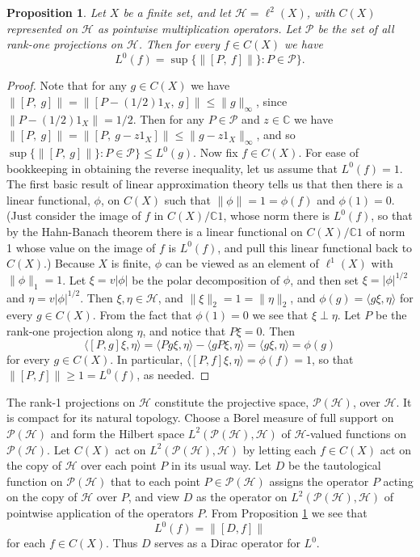 \documentclass{amsart}[14pt]
\newtheorem{proposition}[theorem]{Proposition}
\theoremstyle{definition}
\theoremstyle{remark}
\newcommand{\cH}{{\mathcal H}}
\newcommand{\cP}{{\mathcal P}}
\newcommand{\bC}{{\mathbb C}}
\newcommand{\<}{\langle}
\renewcommand{\>}{\rangle}
\numberwithin{equation}{section}
\begin{document}
{\begin{proposition}
\label{project}
Let $X$ be a finite set, and let $\cH = \ell^2(X)$, with $C(X)$
represented on $\cH$ as pointwise multiplication operators.
Let $\cP$ be the set of all rank-one projections on $\cH$.
Then for every $f \in C(X)$ we have
\[
L^0(f) = \sup \{\|[P, \ f]\|\}: P \in \cP\}  .
\]
\end{proposition}
\begin{proof}
Note that for any $g \in C(X)$ we have 
$\|[P, \ g]\| = \|[P-(1/2)1_X, \ g]\| \leq \|g\|_\infty$,
since $\| P-(1/2)1_X\| = 1/2$.
 Then for any $P \in \cP$ and $z \in \bC$ we have
$\|[P, \ g]\| = \|[P, \ g-z1_X]\| \leq  \|g-z1_X\|_\infty$, and so
$\sup \{\|[P, \ g]\|\}: P \in \cP\}  \leq L^0(g)$.
Now fix $f \in C(X)$.
For ease of bookkeeping in obtaining the reverse inequality,
let us assume that $L^0(f) = 1$. The first basic result of linear
approximation theory tells us that then there is a linear
functional, $\phi$, on $C(X)$ such that $ \|\phi\| = 1 = \phi(f)$
and $\phi(1)= 0$. (Just consider the image of $f$ in $C(X)/\bC 1$, 
whose norm there is $L^0(f)$, so that by the Hahn-Banach theorem
there is a linear functional on $C(X)/\bC 1$ of norm 1 whose value
on the image of $f$ is $L^0(f)$, and pull this linear functional
back to $C(X)$.) Because $X$ is finite, $\phi$ can be viewed as
an element of $\ell^1(X)$ with $\|\phi\|_1 = 1$. 
Let $\xi = v|\phi|$ be the polar
decomposition of $\phi$, and then set $\xi = |\phi|^{1/2}$
and $\eta = v|\phi|^{1/2}$. Then $\xi, \eta \in \cH$, and
$\|\xi\|_2 = 1 = \|\eta\|_2$, and
$\phi(g) = \<g\xi, \eta\>$ for every $g \in C(X)$. From the
fact that $\phi(1) = 0$ we see that $\xi \perp \eta$. Let
$P$ be the rank-one projection along $\eta$, and notice 
that $P\xi = 0$. Then 
\[
\<[P,g]\xi, \eta\> = \<Pg\xi, \eta\> - \<gP\xi, \eta\> 
=\<g\xi, \eta\> = \phi(g)  
\]
for every $g \in C(X)$. In particular, 
$\<[P,f]\xi, \eta\> = \phi(f) = 1$, so that 
$\|[P,f]\| \geq 1= L^0(f)$, as needed.
\end{proof}

The rank-1 projections on $\cH$ constitute the projective
space, $\cP(\cH)$, over $\cH$. It is compact for its natural
topology. Choose a Borel measure of full support on $\cP(\cH)$
and form the Hilbert space $L^2(\cP(\cH), \cH)$ of
$\cH$-valued functions on $\cP(\cH)$. 
Let $C(X)$ act on $L^2(\cP(\cH), \cH)$ by letting each 
$f \in C(X)$ act on the copy of $\cH$ over each point
$P$ in its usual way.
Let $D$ be
the tautological function on $\cP(\cH)$ that to each
point $P \in \cP(\cH)$ assigns the operator $P$ acting
on the copy of $\cH$ over $P$, and view $D$ as
the operator on $L^2(\cP(\cH), \cH)$ 
of pointwise application of the operators $P$. 
From Proposition \ref{project} we see
that 
\[
L^0(f) = \| [D, f] \|
\]
for each $f \in C(X)$. Thus $D$ serves as a Dirac operator
for $L^0$. 

}
\end{document}
